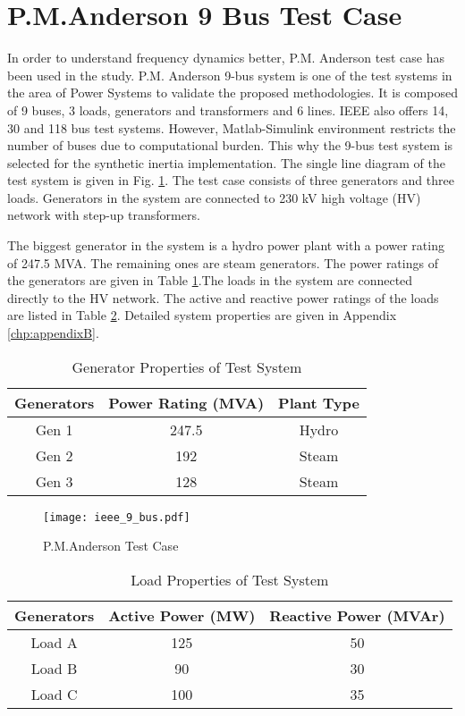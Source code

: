 \section{P.M.Anderson 9 Bus Test Case}
In order to understand frequency dynamics better, P.M. Anderson test case has been used in the study. P.M. Anderson 9-bus system is one of the test systems in the area of Power Systems to validate the proposed methodologies. It is composed of 9 buses, 3 loads, generators and transformers and 6 lines. IEEE also offers 14, 30 and 118 bus test systems. However, Matlab-Simulink environment restricts the number of buses due to computational burden. This why the 9-bus test system is selected for the synthetic inertia implementation. The single line diagram of the test system is given in Fig. \ref{ieee_9_bus}. The test case consists of three generators and three loads. Generators in the system are connected to 230 kV high voltage (HV) network with step-up transformers.\par
The biggest generator in the system is a hydro power plant with a power rating of 247.5 MVA. The remaining ones are steam generators. The power ratings of the generators are given in Table \ref{generatorproperties}.The loads in the system are connected directly to the HV network. The active and reactive power ratings of the loads are listed in Table \ref{loadproperties}. Detailed system properties are given in Appendix \ref{chp:appendixB}.
\begin{table}[h]
	\centering
	\begin{tabular}{ccc}
		\hline
		\textbf{Generators} & \textbf{Power Rating (MVA)} & \textbf{Plant Type} \\ \hline
		Gen 1               & 247.5                       & Hydro				\\
		Gen 2               & 192                         & Steam               \\
		Gen 3               & 128                         & Steam               \\ \hline
	\end{tabular}
	\caption{Generator Properties of Test System}
	\label{generatorproperties}
\end{table}
\begin{figure}[h]
	\centering
	\texttt{[image: ieee\_9\_bus.pdf]}
	\caption{P.M.Anderson Test Case \cite{P.M.1995}}
	\label{ieee_9_bus}
\end{figure}
\begin{table}[h!]
	\centering
	\begin{tabular}{ccc}
		\hline
		\textbf{Generators} & \textbf{Active Power (MW)}  & \textbf{Reactive Power (MVAr)} \\ \hline
		Load A              & 125                      	  & 50				 \\
		Load B              & 90                          & 30                \\
		Load C              & 100                         & 35                \\ \hline
	\end{tabular}
	\caption{Load Properties of Test System}
	\label{loadproperties}
\end{table}
